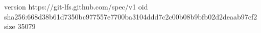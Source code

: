 version https://git-lfs.github.com/spec/v1
oid sha256:668d38b61d7350bc977557e7700ba3104ddd7c2c00b08b9bfb02d2deaab97cf2
size 35079
